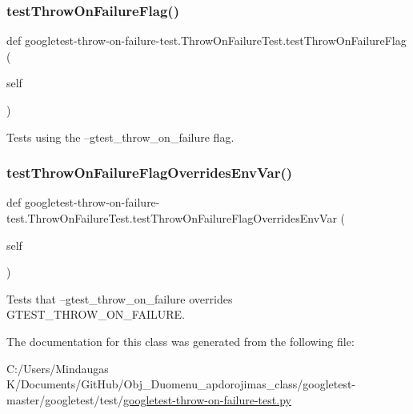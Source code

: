\subsubsection{\texorpdfstring{testThrowOnFailureFlag()}{testThrowOnFailureFlag()}}
{\footnotesize\ttfamily def googletest-\/throw-\/on-\/failure-\/test.\+Throw\+On\+Failure\+Test.\+test\+Throw\+On\+Failure\+Flag (\begin{DoxyParamCaption}\item[{}]{self }\end{DoxyParamCaption})}

\begin{DoxyVerb}Tests using the --gtest_throw_on_failure flag.\end{DoxyVerb}
 \mbox{\label{classgoogletest-throw-on-failure-test_1_1_throw_on_failure_test_a18515553dbfe7b3e6ed6449fa81893c1}} 
\subsubsection{\texorpdfstring{testThrowOnFailureFlagOverridesEnvVar()}{testThrowOnFailureFlagOverridesEnvVar()}}
{\footnotesize\ttfamily def googletest-\/throw-\/on-\/failure-\/test.\+Throw\+On\+Failure\+Test.\+test\+Throw\+On\+Failure\+Flag\+Overrides\+Env\+Var (\begin{DoxyParamCaption}\item[{}]{self }\end{DoxyParamCaption})}

\begin{DoxyVerb}Tests that --gtest_throw_on_failure overrides GTEST_THROW_ON_FAILURE.\end{DoxyVerb}
 

The documentation for this class was generated from the following file\+:\begin{DoxyCompactItemize}
\item 
C\+:/\+Users/\+Mindaugas K/\+Documents/\+Git\+Hub/\+Obj\+\_\+\+Duomenu\+\_\+apdorojimas\+\_\+class/googletest-\/master/googletest/test/\mbox{\hyperlink{googletest-master_2googletest_2test_2googletest-throw-on-failure-test_8py}{googletest-\/throw-\/on-\/failure-\/test.\+py}}\end{DoxyCompactItemize}
